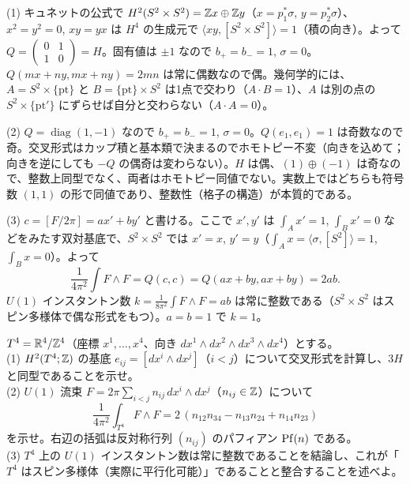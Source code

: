 \begin{solution}
(1) キュネットの公式で $H^2(S^2\times S^2)=\mathbb{Z} x\oplus\mathbb{Z} y$（$x=p_1^*\sigma$, $y=p_2^*\sigma$）、$x^2=y^2=0$, $xy=yx$ は $H^4$ の生成元で $\langle xy,[S^2\times S^2]\rangle=1$（積の向き）。よって $Q=\begin{pmatrix}0&1\\1&0\end{pmatrix}=H$。固有値は $\pm1$ なので $b_+=b_-=1$, $\sigma=0$。$Q(mx+ny,mx+ny)=2mn$ は常に偶数なので偶。幾何学的には、$A=S^2\times\{\mathrm{pt}\}$ と $B=\{\mathrm{pt}\}\times S^2$ は1点で交わり（$A\cdot B=1$）、$A$ は別の点の $S^2\times\{\mathrm{pt}'\}$ にずらせば自分と交わらない（$A\cdot A=0$）。

(2) $Q=\operatorname{diag}(1,-1)$ なので $b_+=b_-=1$, $\sigma=0$。$Q(e_1,e_1)=1$ は奇数なので奇。交叉形式はカップ積と基本類で決まるのでホモトピー不変（向きを込めて；向きを逆にしても $-Q$ の偶奇は変わらない）。$H$ は偶、$(1)\oplus(-1)$ は奇なので、整数上同型でなく、両者はホモトピー同値でない。実数上ではどちらも符号数 $(1,1)$ の形で同値であり、整数性（格子の構造）が本質的である。

(3) $c=[F/2\pi]=ax'+by'$ と書ける。ここで $x',y'$ は $\int_{A}x'=1$, $\int_Bx'=0$ などをみたす双対基底で、$S^2\times S^2$ では $x'=x$, $y'=y$（$\int_Ax=\langle\sigma,[S^2]\rangle=1$, $\int_Bx=0$）。よって
\[
\frac{1}{4\pi^2}\int F\wedge F=Q(c,c)=Q(ax+by,ax+by)=2ab .
\]
$U(1)$ インスタントン数 $k=\frac{1}{8\pi^2}\int F\wedge F=ab$ は常に整数である（$S^2\times S^2$ はスピン多様体で偶な形式をもつ）。$a=b=1$ で $k=1$。
\end{solution}

\begin{problem}[難易度 B]\label{ch06-prob-t4}
$T^4=\mathbb{R}^4/\mathbb{Z}^4$（座標 $x^1,\dots,x^4$、向き $dx^1\wedge dx^2\wedge dx^3\wedge dx^4$）とする。\\
(1) $H^2(T^4;\mathbb{Z})$ の基底 $e_{ij}=[dx^i\wedge dx^j]$（$i<j$）について交叉形式を計算し、$3H$ と同型であることを示せ。\\
(2) $U(1)$ 流束 $F=2\pi\sum_{i<j}n_{ij}\,dx^i\wedge dx^j$（$n_{ij}\in\mathbb{Z}$）について
\[
\frac{1}{4\pi^2}\int_{T^4}F\wedge F=2\,(n_{12}n_{34}-n_{13}n_{24}+n_{14}n_{23})
\]
を示せ。右辺の括弧は反対称行列 $(n_{ij})$ のパフィアン $\operatorname{Pf}(n)$ である。\\
(3) $T^4$ 上の $U(1)$ インスタントン数は常に整数であることを結論し、これが「$T^4$ はスピン多様体（実際に平行化可能）」であることと整合することを述べよ。
\end{problem}

